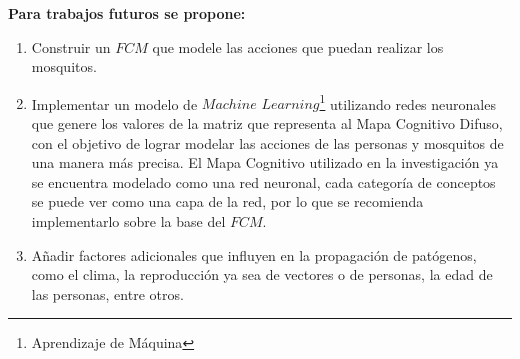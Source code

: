 \begin{recomendations}
    \textbf{Para trabajos futuros se propone:}
    \begin{enumerate}
        \item Construir un $FCM$ que modele las acciones que puedan realizar los mosquitos.
        \item Implementar un modelo de $Machine$ $Learning$\footnote{Aprendizaje de Máquina} utilizando redes neuronales que genere los valores de la matriz que representa al Mapa Cognitivo Difuso, con el objetivo de lograr modelar las acciones de las personas y mosquitos de una manera más precisa. El Mapa Cognitivo utilizado en la investigación ya se encuentra modelado como una red neuronal, cada categoría de conceptos se puede ver como una capa de la red, por lo que se recomienda implementarlo sobre la base del $FCM$.
        \item Añadir factores adicionales que influyen en la propagación de patógenos, como el clima, la reproducción ya sea de vectores o de personas, la edad de las personas, entre otros.
    \end{enumerate}
\end{recomendations}
